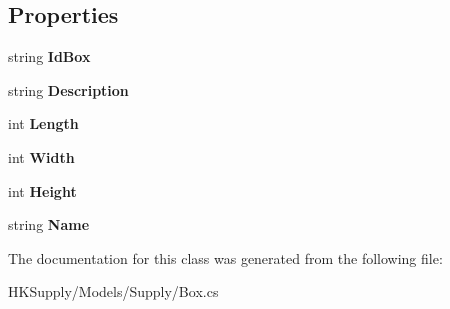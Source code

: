 \subsection*{Properties}
\begin{DoxyCompactItemize}
\item 
\mbox{\label{class_h_k_supply_1_1_models_1_1_supply_1_1_box_a6ce34d08f19001348b38694b66c53bfa}} 
string {\bfseries Id\+Box}
\item 
\mbox{\label{class_h_k_supply_1_1_models_1_1_supply_1_1_box_a1dc7cda67a9029b2b8d16c83b5fa07b7}} 
string {\bfseries Description}
\item 
\mbox{\label{class_h_k_supply_1_1_models_1_1_supply_1_1_box_a18ececce02c255439da4c0ae92a29241}} 
int {\bfseries Length}
\item 
\mbox{\label{class_h_k_supply_1_1_models_1_1_supply_1_1_box_a0c72f3d4101f223786b4e13a28b4979b}} 
int {\bfseries Width}
\item 
\mbox{\label{class_h_k_supply_1_1_models_1_1_supply_1_1_box_a4efbd2904ab19d53fb324604d8d494a4}} 
int {\bfseries Height}
\item 
\mbox{\label{class_h_k_supply_1_1_models_1_1_supply_1_1_box_a9048d5c4ffe27655a58dd0691acc5312}} 
string {\bfseries Name}
\end{DoxyCompactItemize}


The documentation for this class was generated from the following file\+:\begin{DoxyCompactItemize}
\item 
H\+K\+Supply/\+Models/\+Supply/Box.\+cs\end{DoxyCompactItemize}
